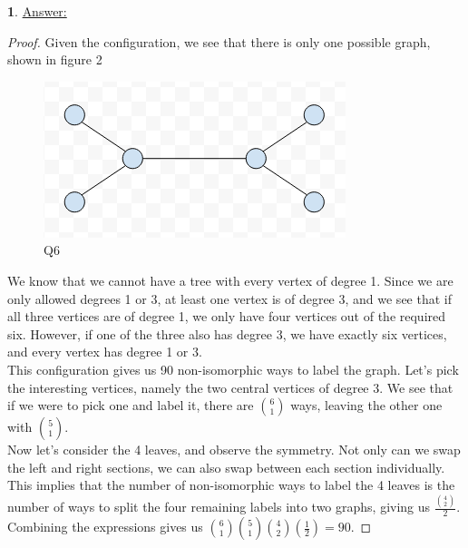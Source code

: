 \documentclass[12pt,a4paper]{article}
\theoremstyle{definition}
\newtheorem{problem}{}
\begin{document}
\begin{problem} \underline{Answer:}
\begin{proof} 
Given the configuration, we see that there is only one possible graph, shown in figure 2

\begin{figure}[H]
    \centering
    \includegraphics[scale=0.5]{q6.png}
    \caption{Q6}
    \label{fig:my_label}
\end{figure}

We know that we cannot have a tree with every vertex of degree 1. Since we are only allowed degrees 1 or 3, at least one vertex is of degree 3, and we see that if all three vertices are of degree 1, we only have four vertices out of the required six. However, if one of the three also has degree 3, we have exactly six vertices, and every vertex has degree 1 or 3. \\

This configuration gives us 90 non-isomorphic ways to label the graph. Let's pick the interesting vertices, namely the two central vertices of degree 3. We see that if we were to pick one and label it, there are $\binom{6}{1}$ ways, leaving the other one with $\binom{5}{1}$. \\

Now let's consider the 4 leaves, and observe the symmetry. Not only can we swap the left and right sections, we can also swap between each section individually. This implies that the number of non-isomorphic ways to label the 4 leaves is the number of ways to split the four remaining labels into two graphs, giving us $\frac{\binom{4}{2}}{2}$. \\

Combining the expressions gives us $\binom{6}{1}\binom{5}{1}\binom{4}{2}(\frac{1}{2}) = 90$.
\end{proof}
\end{problem}
\end{document}
